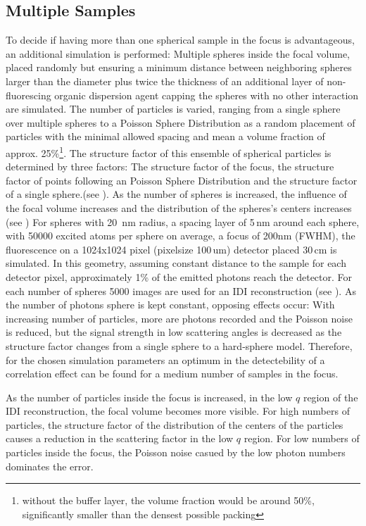 \subsection{Multiple Samples}
To decide if having more than one spherical sample in the focus is advantageous, an additional simulation is performed:
Multiple spheres inside the focal volume, placed randomly but ensuring a minimum distance between neighboring spheres larger than the diameter plus twice the thickness of an additional layer of non-fluorescing organic dispersion agent capping the spheres with no other interaction are simulated.  The number of particles is varied, ranging from a single sphere over multiple spheres to a Poisson Sphere Distribution as a random placement of particles with the minimal allowed spacing and mean a volume fraction of approx. 25\%\footnote{without the buffer layer, the volume fraction would be around 50\%, significantly smaller than the densest possible packing}. 
The structure factor of this ensemble of spherical particles is determined by three factors: The structure factor of the focus, the structure factor of points following an Poisson Sphere Distribution and the structure factor of a single sphere.(see ). As the number of spheres is increased, the influence of the focal volume increases and the distribution of the spheres's centers increases (see  )
For spheres with 20\, nm radius, a spacing layer of 5\,nm around each sphere, with  50000 excited atoms per sphere on average, a focus of 200nm (FWHM), the fluorescence on a 1024x1024 pixel (pixelsize 100\,um) detector placed 30\,cm is simulated. In this geometry, assuming constant distance to the sample for each detector pixel, approximately 1\% of the emitted photons reach the detector. 
For each number of spheres 5000 images are used for an IDI reconstruction (see  ).
As the number of photons sphere is kept constant, opposing effects occur:  With increasing number of particles, more are photons recorded and the Poisson noise is reduced, but the signal strength in low scattering angles is decreased as the structure factor changes from a single sphere to a hard-sphere model. Therefore, for the chosen simulation parameters an optimum in the detectebility of a correlation effect can be found for a medium number of samples in the focus.


As the number of particles inside the focus is increased, in the low $q$ region of the IDI reconstruction, the focal volume becomes more visible. For high numbers of particles, the structure factor of the distribution of the centers of the particles causes a reduction in the scattering factor in the low $q$ region. For low numbers of particles inside the focus, the Poisson noise casued by the low photon numbers dominates the error.



